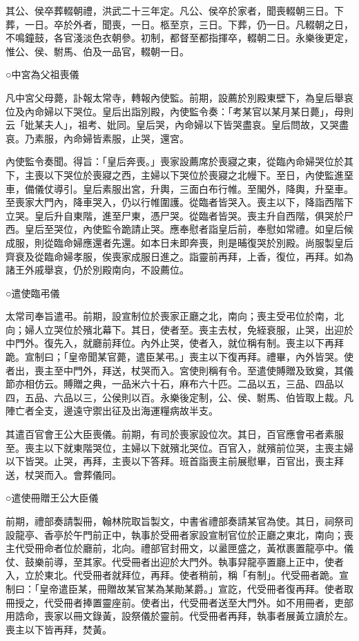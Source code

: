 其公、侯卒葬輟朝禮，洪武二十三年定。凡公、侯卒於家者，聞喪輟朝三日。下葬，一日。卒於外者，聞喪，一日。柩至京，三日。下葬，仍一日。凡輟朝之日，不鳴鐘鼓，各官淺淡色衣朝參。初制，都督至都指揮卒，輟朝二日。永樂後更定，惟公、侯、駙馬、伯及一品官，輟朝一日。

○中宮為父祖喪儀

凡中宮父母薨，訃報太常寺，轉報內使監。前期，設薦於別殿東壁下，為皇后舉哀位及內命婦以下哭位。皇后出詣別殿，內使監令奏：「考某官以某月某日薨」，母則云「妣某夫人」，祖考、妣同。皇后哭，內命婦以下皆哭盡哀。皇后問故，又哭盡哀。乃素服，內命婦皆素服，止哭，還宮。

內使監令奏聞。得旨：「皇后奔喪。」喪家設薦席於喪寢之東，從臨內命婦哭位於其下，主喪以下哭位於喪寢之西，主婦以下哭位於喪寢之北幔下。至日，內使監進堊車，備儀仗導引。皇后素服出宮，升輿，三面白布行帷。至閣外，降輿，升堊車。至喪家大門內，降車哭入，仍以行帷圍護。從臨者皆哭入。喪主以下，降詣西階下立哭。皇后升自東階，進至尸東，憑尸哭。從臨者皆哭。喪主升自西階，俱哭於尸西。皇后至哭位，內使監令跪請止哭。應奉慰者詣皇后前，奉慰如常禮。如皇后候成服，則從臨命婦應還者先還。如本日未即奔喪，則是晡復哭於別殿。尚服製皇后齊衰及從臨命婦孝服，俟喪家成服日進之。詣靈前再拜，上香，復位，再拜。如為諸王外戚舉哀，仍於別殿南向，不設薦位。

○遣使臨弔儀

太常司奉旨遣弔。前期，設宣制位於喪家正廳之北，南向；喪主受弔位於南，北向；婦人立哭位於殯北幕下。其日，使者至。喪主去杖，免絰衰服，止哭，出迎於中門外。復先入，就廳前拜位。內外止哭，使者入，就位稱有制。喪主以下再拜跪。宣制曰；「皇帝聞某官薨，遣臣某弔。」喪主以下復再拜。禮畢，內外皆哭。使者出，喪主至中門外，拜送，杖哭而入。宮使則稱有令。至遣使賻贈及致奠，其儀節亦相仿云。賻贈之典，一品米六十石，麻布六十匹。二品以五，三品、四品以四，五品、六品以三，公侯則以百。永樂後定制，公、侯、駙馬、伯皆取上裁。凡陣亡者全支，邊遠守禦出征及出海運糧病故半支。

其遣百官會王公大臣喪儀。前期，有司於喪家設位次。其日，百官應會弔者素服至。喪主以下就東階哭位，主婦以下就殯北哭位。百官入，就殯前位哭，主喪主婦以下皆哭。止哭，再拜，主喪以下答拜。班首詣喪主前展慰畢，百官出，喪主拜送，杖哭而入。會葬儀同。

○遣使冊贈王公大臣儀

前期，禮部奏請製冊，翰林院取旨製文，中書省禮部奏請某官為使。其日，祠祭司設龍亭、香亭於午門前正中，執事於受冊者家設宣制官位於正廳之東北，南向；喪主代受冊命者位於廳前，北向。禮部官封冊文，以盝匣盛之，黃袱裹置龍亭中。儀仗、鼓樂前導，至其家。代受冊者出迎於大門外。執事舁龍亭置廳上正中，使者入，立於東北。代受冊者就拜位，再拜。使者稍前，稱「有制」。代受冊者跪。宣制曰：「皇帝遣臣某，冊贈故某官某為某勛某爵。」宣訖，代受冊者復再拜。使者取冊授之，代受冊者捧置靈座前。使者出，代受冊者送至大門外。如不用冊者，吏部用誥命，喪家以冊文錄黃，設祭儀於靈前。代受冊者再拜，執事者展黃立讀於左。喪主以下皆再拜，焚黃。

